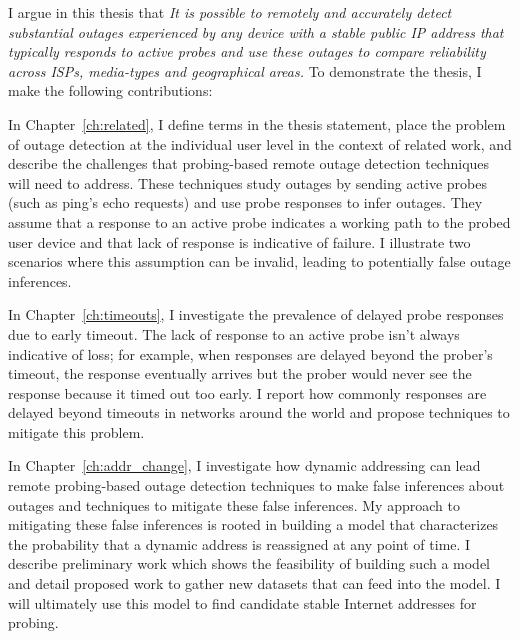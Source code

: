 I argue in this thesis that 
\emph{It is possible to remotely and accurately detect substantial outages
  experienced by any device with a stable public IP address that typically
  responds to active probes and use these outages to compare
  reliability across ISPs, media-types and geographical areas.} To demonstrate the thesis, I make the following
contributions:



In Chapter~\ref{ch:related}, I define terms in the thesis statement, place the problem of outage detection
at the individual user level in the context of related work, and describe the challenges
that probing-based remote outage detection techniques will need to address. These
techniques study outages by sending active probes (such as ping's echo
requests) and use probe responses to infer outages. They assume that a
response to an active probe indicates a working path to the probed
user device and that lack of response is indicative of failure. I
illustrate two scenarios where this assumption can be
invalid, leading to potentially false outage inferences.

In Chapter~\ref{ch:timeouts}, I investigate the prevalence of delayed
probe responses due to early timeout. The
lack of response to an active probe isn't always indicative of loss;
for example, when
responses are delayed beyond the prober's timeout, the response
eventually arrives but the prober would never see the response because
it timed out too early. I report how commonly responses are delayed
beyond timeouts in
networks around the world and propose techniques to mitigate this
problem. 

In Chapter~\ref{ch:addr_change}, I investigate how dynamic addressing can
lead remote probing-based outage detection techniques to make false inferences about outages and techniques to
mitigate these false inferences. My approach to mitigating
these false inferences is rooted in building a model that characterizes
the probability that a dynamic address is reassigned at any point of time. I describe preliminary
work which shows the feasibility of building such a model and detail
proposed work to gather new datasets that can feed into the
model. I will ultimately use this model to find candidate stable Internet
addresses for probing.

